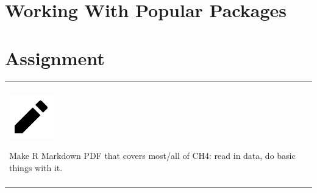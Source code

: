 \documentclass[
]{book}
\newenvironment{assessment}
{
  \begin{center}
  \begin{tabular}{|>{\columncolor{assessment}}p{0.9\textwidth}|}
  \hline\\
  \includegraphics[scale=0.1]{src/images/pencil-fill.png}
}
{\\\\\hline
  \end{tabular}
  \end{center}
}
\begin{document}
\hypertarget{working-with-popular-packages}{%
\section{Working With Popular Packages}\label{working-with-popular-packages}}

\hypertarget{assignment-1}{%
\section{Assignment}\label{assignment-1}}

\begin{assessment}
Make R Markdown PDF that covers most/all of CH4: read in data, do basic
things with it.
\end{assessment}

  
\end{document}
